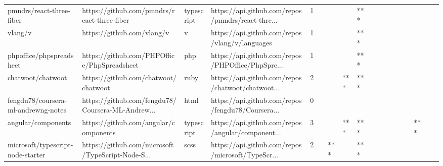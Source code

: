\begin{tabular}{llllrlllllllllllll}
pmndrs/react-three-fiber                           &        https://github.com/pmndrs/react-three-fiber &        typescript &  https://api.github.com/repos/pmndrs/react-thre... &       1 &         &        &           &            *** &                 &        &           &           &          &          &       &              &          \\
vlang/v                                            &                         https://github.com/vlang/v &                 v &     https://api.github.com/repos/vlang/v/languages &       1 &         &        &           &            *** &                 &        &           &           &          &          &       &              &          \\
phpoffice/phpspreadsheet                           &        https://github.com/PHPOffice/PhpSpreadsheet &               php &  https://api.github.com/repos/PHPOffice/PhpSpre... &       1 &         &        &           &            *** &                 &        &           &           &          &          &       &              &          \\
chatwoot/chatwoot                                  &               https://github.com/chatwoot/chatwoot &              ruby &  https://api.github.com/repos/chatwoot/chatwoot... &       2 &         &        &       *** &            *** &                 &        &           &           &          &          &       &              &          \\
fengdu78/coursera-ml-andrewng-notes                &  https://github.com/fengdu78/Coursera-ML-Andrew... &              html &  https://api.github.com/repos/fengdu78/Coursera... &       0 &         &        &           &                &                 &        &           &           &          &          &       &              &          \\
angular/components                                 &              https://github.com/angular/components &        typescript &  https://api.github.com/repos/angular/component... &       3 &         &        &       *** &            *** &                 &        &           &           &          &          &   *** &              &          \\
microsoft/typescript-node-starter                  &  https://github.com/microsoft/TypeScript-Node-S... &              scss &  https://api.github.com/repos/microsoft/TypeScr... &       2 &         &    *** &           &            *** &                 &        &           &           &          &          &       &              &          \\

\end{tabular}
